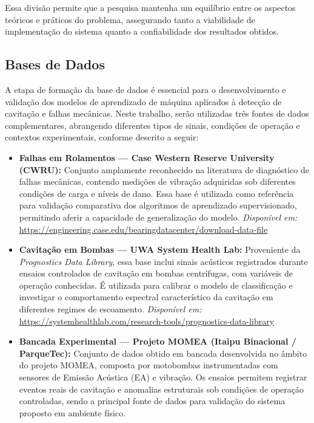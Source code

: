 Essa divisão permite que a pesquisa mantenha um equilíbrio entre os aspectos teóricos e práticos do problema, assegurando tanto a viabilidade de implementação do sistema quanto a confiabilidade dos resultados obtidos.

\subsection*{Bases de Dados}

A etapa de formação da base de dados é essencial para o desenvolvimento e validação dos modelos de aprendizado de máquina aplicados à detecção de cavitação e falhas mecânicas. Neste trabalho, serão utilizadas três fontes de dados complementares, abrangendo diferentes tipos de sinais, condições de operação e contextos experimentais, conforme descrito a seguir:

\begin{itemize}
    \item \textbf{Falhas em Rolamentos — Case Western Reserve University (CWRU):}  
    Conjunto amplamente reconhecido na literatura de diagnóstico de falhas mecânicas, contendo medições de vibração adquiridas sob diferentes condições de carga e níveis de dano. Essa base é utilizada como referência para validação comparativa dos algoritmos de aprendizado supervisionado, permitindo aferir a capacidade de generalização do modelo.  
    \textit{Disponível em:} \url{https://engineering.case.edu/bearingdatacenter/download-data-file}

    \item \textbf{Cavitação em Bombas — UWA System Health Lab:}  
    Proveniente da \textit{Prognostics Data Library}, essa base inclui sinais acústicos registrados durante ensaios controlados de cavitação em bombas centrífugas, com variáveis de operação conhecidas. É utilizada para calibrar o modelo de classificação e investigar o comportamento espectral característico da cavitação em diferentes regimes de escoamento.  
    \textit{Disponível em:} \url{https://systemhealthlab.com/research-tools/prognostics-data-library}

    \item \textbf{Bancada Experimental — Projeto MOMEA (Itaipu Binacional / ParqueTec):}  
    Conjunto de dados obtido em bancada desenvolvida no âmbito do projeto MOMEA, composta por motobombas instrumentadas com sensores de Emissão Acústica (EA) e vibração. Os ensaios permitem registrar eventos reais de cavitação e anomalias estruturais sob condições de operação controladas, sendo a principal fonte de dados para validação do sistema proposto em ambiente físico.
\end{itemize}

